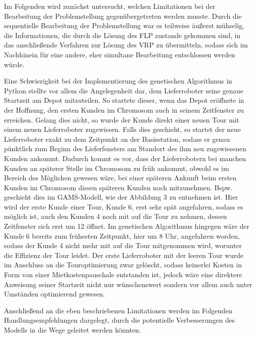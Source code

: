 \documentclass[a4paper,12pt,parskip,bibtotoc,liststotoc]{article}
\begin{document}
Im Folgenden wird zunächst untersucht, welchen Limitationen bei der Bearbeitung der Problemstellung gegenübergetreten werden musste. 
Durch die sequentielle Bearbeitung der Problemstellung war es teilweise äußerst mühselig, die Informationen, die durch die Lösung des FLP zustande gekommen sind, in das anschließende Verfahren zur Lösung des VRP zu übermitteln, sodass sich im Nachhinein für eine andere, eher simultane Bearbeitung entschlossen werden würde.

Eine Schwierigkeit bei der Implementierung des genetischen Algorithmus in Python stellte vor allem die Angelegenheit dar, dem Lieferroboter seine genaue Startzeit am Depot mitzuteilen. 
So startete dieser, wenn das Depot eröffnete in der Hoffnung, den ersten Kunden im Chromosom auch in seinem Zeitfenster zu erreichen. 
Gelang dies nicht, so wurde der Kunde direkt einer neuen Tour mit einem neuen Lieferroboter zugewiesen. 
Falls dies geschieht, so startet der neue Lieferroboter exakt zu dem Zeitpunkt an der Basisstation, sodass er genau pünktlich zum Beginn des Lieferfensters am Standort des ihm neu zugewiesenen Kunden ankommt.
Dadurch kommt es vor, dass der Lieferrobotern bei manchen Kunden an späterer Stelle im Chromosom zu früh ankommt, obwohl es im Bereich des Möglichen gewesen wäre, bei einer späteren Ankunft beim ersten Kunden im Chromosom diesen späteren Kunden noch mitzunehmen.
Bspw. geschieht dies im GAMS-Modell, wie der Abbildung 3 zu entnehmen ist. 
Hier wird der erste Kunde einer Tour, Kunde 6, erst sehr spät angefahren, sodass es möglich ist, auch den Kunden 4 noch mit auf die Tour zu nehmen, dessen Zeitfenster sich erst um 12 öffnet. 
Im genetischen Algorithmus hingegen wäre der Kunde 6 bereits zum frühesten Zeitpunkt, hier um 8 Uhr, angefahren worden, sodass der Kunde 4 nicht mehr mit auf die Tour mitgenommen wird, worunter die Effizienz der Tour leidet.
Der erste Lieferroboter mit der leeren Tour wurde im Anschluss an die Touroptimierung zwar gelöscht, sodass keinerlei Kosten in Form von einer Mietkostenpauschale entstanden ist, jedoch wäre eine direktere Anweisung seiner Startzeit nicht nur wünschenswert sondern vor allem auch unter Umständen optimierend gewesen.


Anschließend an die eben beschriebenen Limitationen werden im Folgenden Handlungsempfehlungen dargelegt, durch die potentielle Verbesserungen des Modells in die Wege geleitet werden könnten.
\end{document}
